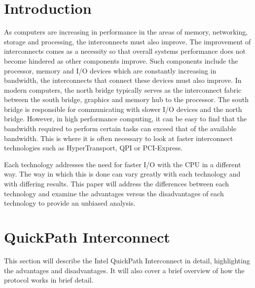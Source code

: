 \documentclass[conference]{IEEEtran}
\begin{document}
\section{Introduction}
\label{sec:intro}
As computers are increasing in performance in the areas of memory, networking,
storage and processing, the interconnects must also improve. The improvement of
interconnects comes as a necessity so that overall systems performance does not
become hindered as other components improve. Such components include the
processor, memory and I/O devices which are constantly increasing in bandwidth,
the interconnects that connect these devices must also improve. 
In modern computers, the north bridge typically serves as the interconnect fabric
between the south bridge, graphics and memory hub to the processor. The
south bridge is responsible for communicating with slower I/O devices and the
north bridge. However, in high performance computing, it can be easy to find
that the bandwidth required to perform certain tasks can exceed that of the
available bandwidth. This is where it is often necessary to look at faster
interconnect technologies such as HyperTransport, QPI or PCI-Express. 

Each technology addresses the need for faster I/O with the CPU in a different
way. The way in which this is done can vary greatly with each technology and
with differing results. This paper will address the differences between each
technology and examine the advantages versus the disadvantages of each
technology to provide an unbiased analysis. 

\section{QuickPath Interconnect}
This section will describe the Intel QuickPath Interconnect in detail,
highlighting the advantages and disadvantages. It will also cover a brief
overview of how the protocol works in brief detail. 
\end{document}

